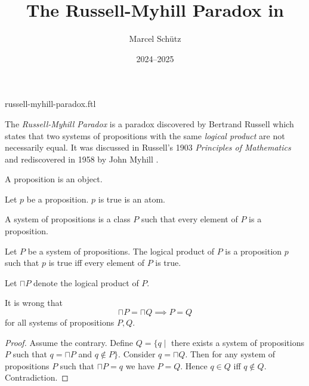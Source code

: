 \documentclass{article}
\title{The Russell-Myhill Paradox in \Naproche}
\author{Marcel Schütz}
\date{2024--2025}
\begin{document}
\begin{smodule}{russell-myhill-paradox.ftl}
\maketitle


\noindent The \emph{Russell-Myhill Paradox} is a paradox discovered by 
Bertrand Russell which states that two systems of propositions with the same 
\emph{logical product} are not necessarily equal.
It was discussed in Russell's 1903 \emph{Principles of Mathematics}
\cite[Appendix B]{Russell1903} and rediscovered in 1958 by John Myhill
\cite{Myhill1958}.

\begin{forthel}
  \begin{signature*}
    A proposition is an object.
  \end{signature*}

  \begin{signature*}
    Let $p$ be a proposition.
    $p$ is true is an atom.
  \end{signature*}

  \begin{definition*}
    A system of propositions is a class $P$ such that every element of $P$ is a proposition.
  \end{definition*}

  \begin{signature*}
    Let $P$ be a system of propositions.
    The logical product of $P$ is a proposition $p$ such that $p$ is true iff every element of $P$ is true.
  \end{signature*}
  
  Let $\sqcap P$ denote the logical product of $P$.
  
  \begin{theorem*}[title=Russell-Myhill Paradox,id=russell_myhill_paradox]
    It is wrong that
    \[ \sqcap P = \sqcap Q \implies P = Q \]
    for all systems of propositions $P, Q$.
  \end{theorem*}
  \begin{proof}
    Assume the contrary.
    Define $Q = \{q \mid$ there exists a system of propositions $P$ such that $q = \sqcap P$ and $q \notin P\}$.
    Consider $q = \sqcap Q$.
    Then for any system of propositions $P$ such that $\sqcap P = q$ we have $P = Q$.
    Hence $q \in Q$ iff $q \notin Q$.
    Contradiction.
  \end{proof}
\end{forthel}

\printbibliography
{}
\end{smodule}
\end{document}
